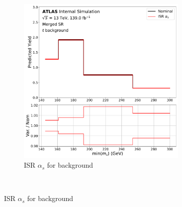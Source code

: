 \begin{figure}[!tb]
\begin{subfigure}{0.45\textwidth}
    \includegraphics[width=0.9\textwidth]{Figures/6/ISR_alphas_syst_ttbar_SR_mgd_TARJets10_minmS_mgd_yield.pdf}
    \caption{ISR \(\alpha_s\) for \ttbar background}
    \label{fig:ttbar_ISR_alphas}
    \end{subfigure} \\ \vspace{1em}
    

\end{figure}
